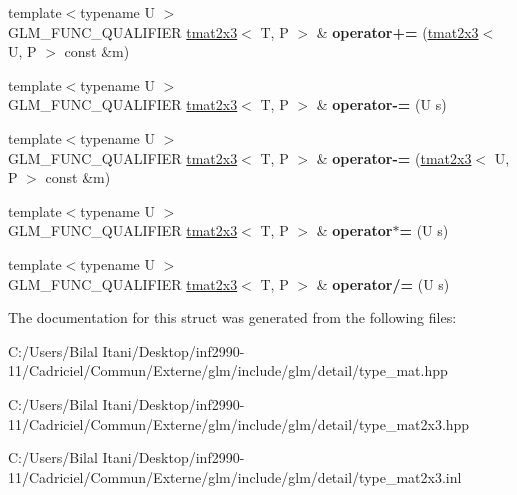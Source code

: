 \begin{DoxyCompactItemize}
\item 
{\footnotesize template$<$typename U $>$ }\\G\+L\+M\+\_\+\+F\+U\+N\+C\+\_\+\+Q\+U\+A\+L\+I\+F\+I\+ER \hyperlink{structglm_1_1detail_1_1tmat2x3}{tmat2x3}$<$ T, P $>$ \& {\bfseries operator+=} (\hyperlink{structglm_1_1detail_1_1tmat2x3}{tmat2x3}$<$ U, P $>$ const \&m)\hypertarget{structglm_1_1detail_1_1tmat2x3_a5e17d74534e51b89fc4ef088fa42c867}{}\label{structglm_1_1detail_1_1tmat2x3_a5e17d74534e51b89fc4ef088fa42c867}

\item 
{\footnotesize template$<$typename U $>$ }\\G\+L\+M\+\_\+\+F\+U\+N\+C\+\_\+\+Q\+U\+A\+L\+I\+F\+I\+ER \hyperlink{structglm_1_1detail_1_1tmat2x3}{tmat2x3}$<$ T, P $>$ \& {\bfseries operator-\/=} (U s)\hypertarget{structglm_1_1detail_1_1tmat2x3_a9390f2064f9bdea63dc4e796822a42d4}{}\label{structglm_1_1detail_1_1tmat2x3_a9390f2064f9bdea63dc4e796822a42d4}

\item 
{\footnotesize template$<$typename U $>$ }\\G\+L\+M\+\_\+\+F\+U\+N\+C\+\_\+\+Q\+U\+A\+L\+I\+F\+I\+ER \hyperlink{structglm_1_1detail_1_1tmat2x3}{tmat2x3}$<$ T, P $>$ \& {\bfseries operator-\/=} (\hyperlink{structglm_1_1detail_1_1tmat2x3}{tmat2x3}$<$ U, P $>$ const \&m)\hypertarget{structglm_1_1detail_1_1tmat2x3_af1abd73945e5346e7ae1e5a953979aff}{}\label{structglm_1_1detail_1_1tmat2x3_af1abd73945e5346e7ae1e5a953979aff}

\item 
{\footnotesize template$<$typename U $>$ }\\G\+L\+M\+\_\+\+F\+U\+N\+C\+\_\+\+Q\+U\+A\+L\+I\+F\+I\+ER \hyperlink{structglm_1_1detail_1_1tmat2x3}{tmat2x3}$<$ T, P $>$ \& {\bfseries operator$\ast$=} (U s)\hypertarget{structglm_1_1detail_1_1tmat2x3_acb4473b53bf98d8330710d21fcfd9413}{}\label{structglm_1_1detail_1_1tmat2x3_acb4473b53bf98d8330710d21fcfd9413}

\item 
{\footnotesize template$<$typename U $>$ }\\G\+L\+M\+\_\+\+F\+U\+N\+C\+\_\+\+Q\+U\+A\+L\+I\+F\+I\+ER \hyperlink{structglm_1_1detail_1_1tmat2x3}{tmat2x3}$<$ T, P $>$ \& {\bfseries operator/=} (U s)\hypertarget{structglm_1_1detail_1_1tmat2x3_a98a33b4a96b4e55c24aee023e382eedd}{}\label{structglm_1_1detail_1_1tmat2x3_a98a33b4a96b4e55c24aee023e382eedd}

\end{DoxyCompactItemize}


The documentation for this struct was generated from the following files\+:\begin{DoxyCompactItemize}
\item 
C\+:/\+Users/\+Bilal Itani/\+Desktop/inf2990-\/11/\+Cadriciel/\+Commun/\+Externe/glm/include/glm/detail/type\+\_\+mat.\+hpp\item 
C\+:/\+Users/\+Bilal Itani/\+Desktop/inf2990-\/11/\+Cadriciel/\+Commun/\+Externe/glm/include/glm/detail/type\+\_\+mat2x3.\+hpp\item 
C\+:/\+Users/\+Bilal Itani/\+Desktop/inf2990-\/11/\+Cadriciel/\+Commun/\+Externe/glm/include/glm/detail/type\+\_\+mat2x3.\+inl\end{DoxyCompactItemize}
